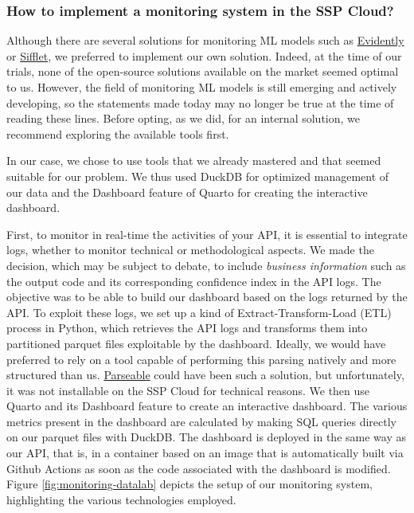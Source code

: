 \subsubsection{How to implement a monitoring system in the SSP Cloud?}

Although there are several solutions for monitoring ML models such as \href{https://www.evidentlyai.com/}{Evidently} or \href{https://www.siffletdata.com/}{Sifflet}, we preferred to implement our own solution. Indeed, at the time of our trials, none of the open-source solutions available on the market seemed optimal to us. However, the field of monitoring ML models is still emerging and actively developing, so the statements made today may no longer be true at the time of reading these lines. Before opting, as we did, for an internal solution, we recommend exploring the available tools first.

In our case, we chose to use tools that we already mastered and that seemed suitable for our problem. We thus used DuckDB for optimized management of our data and the Dashboard feature of Quarto for creating the interactive dashboard. 

First, to monitor in real-time the activities of your API, it is essential to integrate logs, whether to monitor technical or methodological aspects. We made the decision, which may be subject to debate, to include \textit{business information} such as the output code and its corresponding confidence index in the API logs. The objective was to be able to build our dashboard based on the logs returned by the API. To exploit these logs, we set up a kind of Extract-Transform-Load (ETL) process in Python, which retrieves the API logs and transforms them into partitioned parquet files exploitable by the dashboard. Ideally, we would have preferred to rely on a tool capable of performing this parsing natively and more structured than us. \href{https://www.parseable.com/}{Parseable} could have been such a solution, but unfortunately, it was not installable on the SSP Cloud for technical reasons. We then use Quarto and its Dashboard feature to create an interactive dashboard. The various metrics present in the dashboard are calculated by making SQL queries directly on our parquet files with DuckDB. The dashboard is deployed in the same way as our API, that is, in a container based on an image that is automatically built via Github Actions as soon as the code associated with the dashboard is modified. Figure \ref{fig:monitoring-datalab} depicts the setup of our monitoring system, highlighting the various technologies employed.

